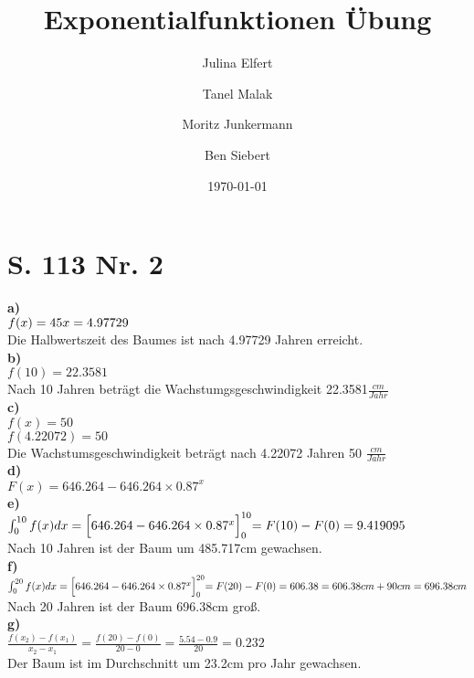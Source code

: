 \documentclass[12pt, a4paper]{report}
\begin{document}
	\title{Exponentialfunktionen Übung}
	\date{\today}
	\author{Julina Elfert \and Tanel Malak \and Moritz Junkermann \and Ben Siebert}
	\maketitle
	\tableofcontents
	\bsremovechaptertitle
	\chapter{S. 113 Nr. 2}
	\textbf{a)} \\
	$f(x) = 45 \\
	x = 4.97729$
	\\
	Die Halbwertszeit des Baumes ist nach 4.97729 Jahren erreicht. \\
	\textbf{b)} \\
	$f(10) = 22.3581$ \\
	Nach 10 Jahren beträgt die Wachstumgsgeschwindigkeit 22.3581$\frac{cm}{Jahr}$
	\\
	\textbf{c)} \\
	$f(x) = 50$ \\
	$f(4.22072) = 50$ \\
	Die Wachstumsgeschwindigkeit beträgt nach 4.22072 Jahren 50 $\frac{cm}{Jahr}$
	\\
	\textbf{d)} \\
	$F(x) = 646.264 - 646.264 \times 0.87^x$ \\
	\textbf{e)} \\
	$
	\int_{0}^{10} f(x) dx = \Bigl[646.264 - 646.264 \times 0.87^x\Bigl]_{0}^{10} = F(10) - F(0) = 9.419095
	$ \\
	Nach 10 Jahren ist der Baum um 485.717cm gewachsen. \\
	\textbf{f)} \\
	$
	\int_{0}^{20} f(x) dx = \Bigl[646.264 - 646.264 \times 0.87^x\Bigl]_{0}^{20} = F(20) - F(0) = 606.38 \\
	 = 606.38cm + 90cm = 696.38cm
	$ \\
	Nach 20 Jahren ist der Baum 696.38cm groß. \\
	\textbf{g)} \\
	$
	\frac{f(x_2) - f(x_1)}{x_2 - x_1} = \frac{f(20) - f(0)}{20 - 0} = \frac{5.54 - 0.9}{20} = 0.232
	$ \\
	Der Baum ist im Durchschnitt um 23.2cm pro Jahr gewachsen.
\end{document}

